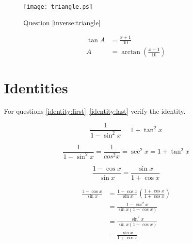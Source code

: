\documentclass[fleqn,addpoints]{exam}
\begin{document}
\begin{questions}
\begin{figure}[H]
  \centering
  \texttt{[image: triangle.ps]}
  \caption*{Question \ref{inverse:triangle}}
\end{figure}

\begin{solution}[1 cm]
\begin{align*}
  \tan A &= \frac{x+1}{10} \\
  A &= \arctan \left( \frac{x+1}{10} \right)
\end{align*}

\end{solution}

 
\ifprintanswers
\else
\pagebreak
\fi

\section{Identities}




For questions \ref{identity:first}--\ref{identity:last} verify the identity.


\question[5]
\label{identity:first}
\[
  \frac{1}{1 - \sin^2x} = 1 + \tan^2 x
\]
\begin{solution}[3 cm]
\[
  \frac{1}{1 - \sin^2x} = \frac{1}{cos^2 x} = \sec^2 x = 1 + \tan^2 x
\]

\end{solution}

\question[5]
\[
  \frac{1 - \cos x}{\sin x} = \frac{\sin x}{1 + \cos x}
\]
\begin{solution}[3 cm]
\begin{align*}
  \frac{1 - \cos x}{\sin x} &= \frac{1 - \cos x}{\sin x} \left( \frac{1 + \cos x}{1 + \cos x} \right) \\
  &= \frac{1 - \cos^2x}{\sin x (1 + \cos x)} \\
  &= \frac{\sin^2x}{\sin x (1 + \cos x) } \\
  &= \frac{\sin x}{1 + \cos x} \\
\end{align*}
\end{solution}


\end{questions}
\end{document}
